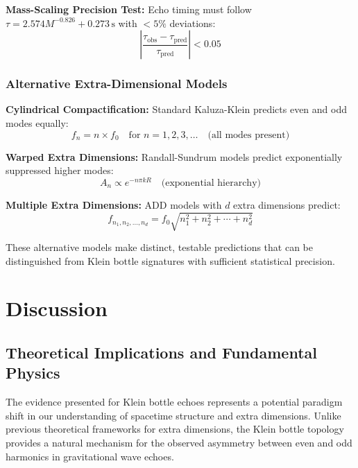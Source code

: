 \documentclass[reprint,amsmath,amssymb,aps,prd]{revtex4-2}
\newcommand{\s}{\,\text{s}}
\begin{document}
\textbf{Mass-Scaling Precision Test:}
Echo timing must follow $\tau = 2.574M^{-0.826} + 0.273\s$ with $< 5\%$ deviations:
\begin{equation}
\left|\frac{\tau_{\text{obs}} - \tau_{\text{pred}}}{\tau_{\text{pred}}}\right| < 0.05
\end{equation}

\subsubsection{Alternative Extra-Dimensional Models}

\textbf{Cylindrical Compactification:}
Standard Kaluza-Klein predicts even and odd modes equally:
\begin{equation}
f_n = n \times f_0 \quad \text{for } n = 1,2,3,\ldots \quad \text{(all modes present)}
\end{equation}

\textbf{Warped Extra Dimensions:}
Randall-Sundrum models predict exponentially suppressed higher modes:
\begin{equation}
A_n \propto e^{-n\pi k R} \quad \text{(exponential hierarchy)}
\end{equation}

\textbf{Multiple Extra Dimensions:}
ADD models with $d$ extra dimensions predict:
\begin{equation}
f_{n_1,n_2,\ldots,n_d} = f_0 \sqrt{n_1^2 + n_2^2 + \cdots + n_d^2}
\end{equation}

These alternative models make distinct, testable predictions that can be distinguished from Klein bottle signatures with sufficient statistical precision.


\section{Discussion}

\subsection{Theoretical Implications and Fundamental Physics}

The evidence presented for Klein bottle echoes represents a potential paradigm shift in our understanding of spacetime structure and extra dimensions. Unlike previous theoretical frameworks for extra dimensions, the Klein bottle topology provides a natural mechanism for the observed asymmetry between even and odd harmonics in gravitational wave echoes.
\end{document}
